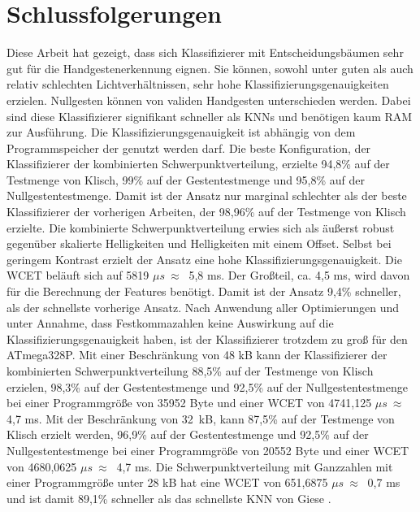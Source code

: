 \chapter{Schlussfolgerungen}
Diese Arbeit hat gezeigt, dass sich Klassifizierer mit Entscheidungsbäumen sehr gut für die Handgestenerkennung eignen. Sie können, sowohl unter guten als auch
relativ schlechten Lichtverhältnissen, sehr hohe Klassifizierungsgenauigkeiten erzielen. Nullgesten können von validen Handgesten unterschieden werden. Dabei sind diese Klassifizierer signifikant
schneller als KNNs und benötigen kaum RAM zur Ausführung. Die Klassifizierungsgenauigkeit ist abhängig von dem Programmspeicher der genutzt werden darf.
\newline
\newline
Die beste Konfiguration, der Klassifizierer der kombinierten Schwerpunktverteilung, erzielte 94,8\% auf der Testmenge von Klisch, 99\% auf der Gestentestmenge und 95,8\% auf der Nullgestentestmenge. Damit
ist der Ansatz nur marginal schlechter als der beste Klassifizierer der vorherigen Arbeiten, der 98,96\% auf der Testmenge von Klisch erzielte. Die kombinierte Schwerpunktverteilung erwies sich als
äußerst robust gegenüber skalierte Helligkeiten und Helligkeiten mit einem Offset. Selbst bei geringem Kontrast erzielt der Ansatz eine hohe Klassifizierungsgenauigkeit. Die WCET beläuft
sich auf 5819 $\mu s\ \approx\ $ 5,8 ms. Der Großteil, ca. 4,5 ms, wird davon für die Berechnung der Features benötigt. Damit ist der Ansatz 9,4\% schneller, als der schnellste vorherige Ansatz.
Nach Anwendung aller Optimierungen und unter Annahme, dass Festkommazahlen keine Auswirkung auf die Klassifizierungsgenauigkeit haben, ist der Klassifizierer trotzdem zu groß für den ATmega328P.
\newline
\newline
Mit einer Beschränkung von 48 kB kann der Klassifizierer der kombinierten Schwerpunktverteilung 88,5\% auf der Testmenge von Klisch erzielen, 98,3\% auf
der Gestentestmenge und 92,5\% auf der Nullgestentestmenge bei einer Programmgröße von 35952 Byte und einer WCET von 4741,125 $\mu s\ \approx\ $ 4,7 ms. Mit der Beschränkung von 32\ kB, kann 87,5\% auf der
Testmenge von Klisch erzielt werden, 96,9\% auf der Gestentestmenge und 92,5\% auf der Nullgestentestmenge bei einer Programmgröße von 20552 Byte und einer WCET von 4680,0625 $\mu s\ \approx\ $ 4,7 ms.
\newline
\newline
Die Schwerpunktverteilung mit Ganzzahlen mit einer Programmgröße unter 28 kB hat eine WCET von 651,6875 $\mu s\ \approx\ $ 0,7 ms und ist damit 89,1\% schneller als das schnellste KNN von Giese \cite{gieseThesis}.
